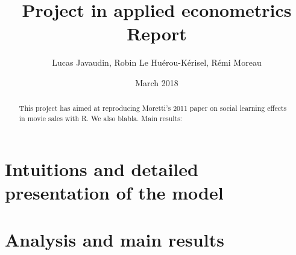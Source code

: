 \documentclass{article}
\title{Project in applied econometrics\\ Report}
\author{Lucas Javaudin, Robin Le Huérou-Kérisel, Rémi Moreau}
\date{March 2018}
\begin{document}
\maketitle

%
%
%
%
%
\begin{abstract}
	This project has aimed at reproducing Moretti's 2011 paper on social learning effects in movie sales with R. We also blabla. Main results:
\end{abstract}
\tableofcontents
\pagebreak
\section{Intuitions and detailed presentation of the model}


\pagebreak
\section{Analysis and main results}



\pagebreak

\pagebreak
\end{document}
